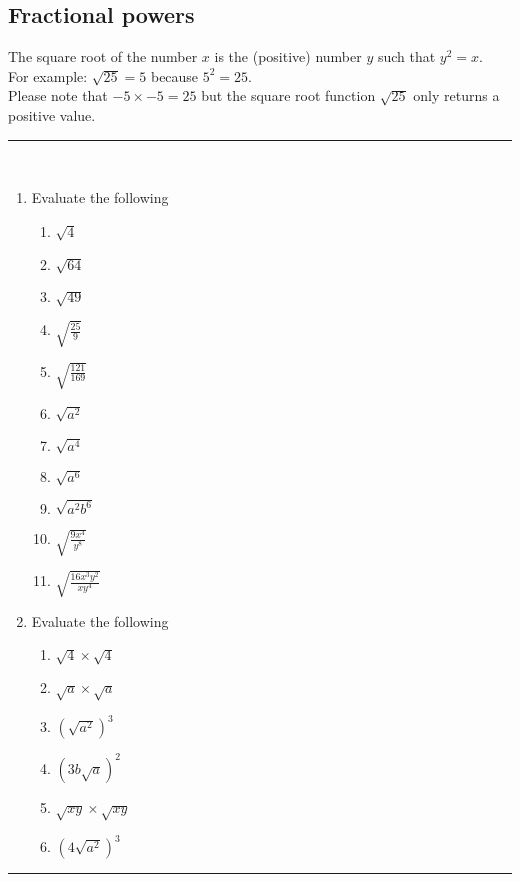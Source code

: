 \documentclass[a4paper,12pt]{article}
\newcommand\questionend{
	\rule[0pt]{17cm}{0.5pt}\vspace{-0.5cm}\\
}
\begin{document}
\subsection*{Fractional powers}
The square root of the number $x$ is the (positive) number $y$ such that $y^2 = x$.\\
For example: $\sqrt{25} = 5$ because $5^2 = 25$.\\
Please note that $-5 \times -5 = 25$ but the square root function $\sqrt{25}$ only returns a positive value.
\questionend
\begin{enumerate}[label=\normalsize \arabic*)~~~ , leftmargin=1cm]
\item Evaluate the following
\begin{multicols}{3}
	\begin{enumerate}[label=\normalsize \alph*)~~~ , topsep=8pt,itemsep=5pt,partopsep=4pt, parsep=4pt]
		\item $\displaystyle \sqrt{4} $
		\item $\displaystyle  \sqrt{64}  $
		\item $\displaystyle \sqrt{49}  $
		\item $\displaystyle \sqrt{ \frac{25}{ 9 } }$
		\item $\displaystyle \sqrt{ \frac{121}{ 169 } }$
		\item $\displaystyle \sqrt{a^2}$
		\item $\displaystyle \sqrt{a^4}$
		\item $\displaystyle \sqrt{a^6}$
		\item $\displaystyle \sqrt{a^2b^6 }$
			\item $\displaystyle \sqrt{ \frac{9x^4}{y^8} }$
				\item $\displaystyle \sqrt{ \frac{16x^3y^2}{xy^4} }$
	\end{enumerate}
\end{multicols}
\item Evaluate the following
\begin{multicols}{3}
	\begin{enumerate}[label=\normalsize \alph*)~~~ , topsep=8pt,itemsep=5pt,partopsep=4pt, parsep=4pt]
		\item $\displaystyle \sqrt{4} \times \sqrt{4} $
		\item $\displaystyle  \sqrt{a} \times \sqrt{a}   $
		\item $\displaystyle (\sqrt{a^2})^3  $
		\item $\displaystyle (3b\sqrt{a})^2  $
		\item $\displaystyle\sqrt{xy} \times \sqrt{xy}$
		\item $\displaystyle (4\sqrt{a^2})^3$
	\end{enumerate}
\end{multicols}
\end{enumerate}
\questionend
\end{document}

